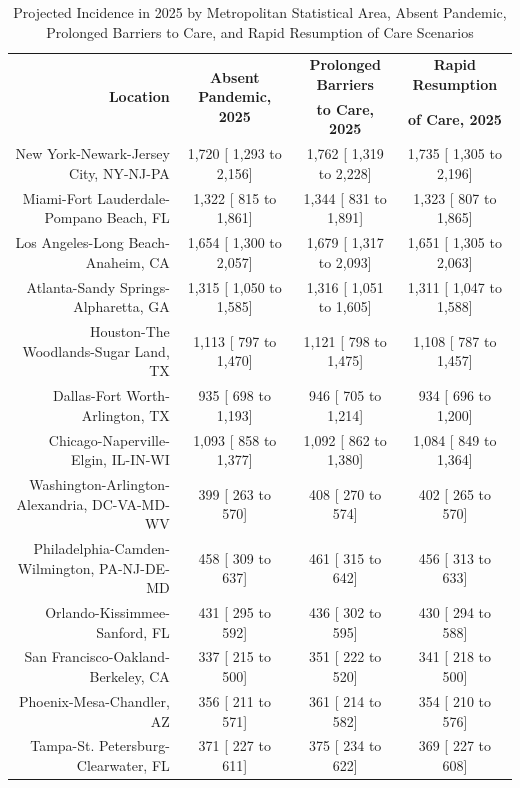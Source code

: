 \documentclass{article}
\begin{document}
\begin{table}[H]
	\caption{Projected Incidence in 2025 by Metropolitan Statistical Area, Absent Pandemic, Prolonged Barriers to Care, and Rapid Resumption of Care Scenarios}
	\footnotesize
	\begin{tabular}{|r|c|c|c|}
		\hline
		\multirow{2}{*}{\textbf{Location}} & \multirow{2}{*}{\textbf{Absent Pandemic, 2025}} & \textbf{Prolonged Barriers} & \textbf{Rapid Resumption}\\
		&  & \textbf{to Care, 2025} & \textbf{of Care, 2025}\\
		\hline\hline
		New York-Newark-Jersey City, NY-NJ-PA &  1,720 [ 1,293 to  2,156] &  1,762 [ 1,319 to  2,228] &  1,735 [ 1,305 to  2,196]\\
		Miami-Fort Lauderdale-Pompano Beach, FL &  1,322 [   815 to  1,861] &  1,344 [   831 to  1,891] &  1,323 [   807 to  1,865]\\
		Los Angeles-Long Beach-Anaheim, CA &  1,654 [ 1,300 to  2,057] &  1,679 [ 1,317 to  2,093] &  1,651 [ 1,305 to  2,063]\\
		Atlanta-Sandy Springs-Alpharetta, GA &  1,315 [ 1,050 to  1,585] &  1,316 [ 1,051 to  1,605] &  1,311 [ 1,047 to  1,588]\\
		Houston-The Woodlands-Sugar Land, TX &  1,113 [   797 to  1,470] &  1,121 [   798 to  1,475] &  1,108 [   787 to  1,457]\\
		Dallas-Fort Worth-Arlington, TX &    935 [   698 to  1,193] &    946 [   705 to  1,214] &    934 [   696 to  1,200]\\
		Chicago-Naperville-Elgin, IL-IN-WI &  1,093 [   858 to  1,377] &  1,092 [   862 to  1,380] &  1,084 [   849 to  1,364]\\
		Washington-Arlington-Alexandria, DC-VA-MD-WV &    399 [   263 to    570] &    408 [   270 to    574] &    402 [   265 to    570]\\
		Philadelphia-Camden-Wilmington, PA-NJ-DE-MD &    458 [   309 to    637] &    461 [   315 to    642] &    456 [   313 to    633]\\
		Orlando-Kissimmee-Sanford, FL &    431 [   295 to    592] &    436 [   302 to    595] &    430 [   294 to    588]\\
		San Francisco-Oakland-Berkeley, CA &    337 [   215 to    500] &    351 [   222 to    520] &    341 [   218 to    500]\\
		Phoenix-Mesa-Chandler, AZ &    356 [   211 to    571] &    361 [   214 to    582] &    354 [   210 to    576]\\
		Tampa-St. Petersburg-Clearwater, FL &    371 [   227 to    611] &    375 [   234 to    622] &    369 [   227 to    608]\\

\end{tabular}
\end{table}
\end{document}
